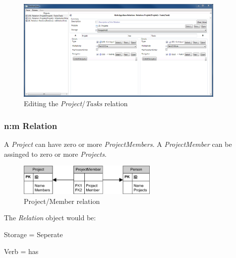 \begin{figure}[ht]
	\begin{center}
		\includegraphics[width=0.9\textwidth]{images/ScreenShot_Rel_Project_Task.png}
		\caption{Editing the \emph{Project}/\emph{Tasks} relation}
		\label{editing_project_tasks_relation}
	\end{center}
\end{figure}

\subsubsection{n:m Relation}
A \emph{Project} can have zero or more \emph{ProjectMembers}. A \emph{ProjectMember} can be assinged to zero or more \emph{Projects}.

\begin{figure}[ht]
	\begin{center}
		\includegraphics[width=0.6\textwidth]{images/Rel_n_m_Project_Member.png}
		\caption{Project/Member relation}
		\label{project_member_relation}
	\end{center}
\end{figure}

The \emph{Relation} object would be:
\begin{descriptionBorder}
	\item[Storage] 		{ = Seperate }
	\item[Verb] 		{ = has }
\end{descriptionBorder}

